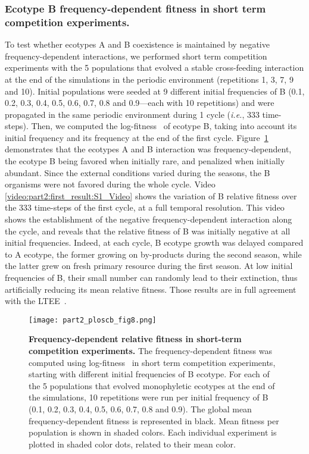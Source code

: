 \subsubsection*{Ecotype B frequency-dependent fitness in short term competition experiments.}

To test whether ecotypes A and B coexistence is maintained by negative frequency-dependent interactions, we performed short term competition experiments with the 5 populations that evolved a stable cross-feeding interaction at the end of the simulations in the periodic environment (repetitions 1, 3, 7, 9 and 10). Initial populations were seeded at 9 different initial frequencies of B (0.1, 0.2, 0.3, 0.4, 0.5, 0.6, 0.7, 0.8 and 0.9---each with 10 repetitions) and were propagated in the same periodic environment during 1 cycle (\textit{i.e.}, 333 time-steps). Then, we computed the log-fitness~\citep{chevin-2011} of ecotype B, taking into account its initial frequency and its frequency at the end of the first cycle. Figure~\ref{fig:part2:first_result:Fig8} demonstrates that the ecotypes A and B interaction was frequency-dependent, the ecotype B being favored when initially rare, and penalized when initially abundant.
Since the external conditions varied during the seasons, the B organisms were not favored during the whole cycle. Video \ref{video:part2:first_result:S1_Video} shows the variation of B relative fitness over the 333 time-steps of the first cycle, at a full temporal resolution. This video shows the establishment of the negative frequency-dependent interaction along the cycle, and reveals that the relative fitness of B was initially negative at all initial frequencies. Indeed, at each cycle, B ecotype growth was delayed compared to A ecotype, the former growing on by-products during the second season, while the latter grew on fresh primary resource during the first season.
At low initial frequencies of B, their small number can randomly lead to their extinction, thus artificially reducing its mean relative fitness.
Those results are in full agreement with the LTEE~\citep{rozen-et-al-2000,ribeck-lenski-2015}.

\begin{figure}[!h]
\centering
\texttt{[image: part2\_ploscb\_fig8.png]}
\caption[Frequency-dependent relative fitness in short-term competition experiments.]{{\bf Frequency-dependent relative fitness in short-term competition experiments.} The frequency-dependent fitness was computed using log-fitness~\cite{chevin-2011,ribeck-lenski-2015} in short term competition experiments, starting with different initial frequencies of B ecotype. For each of the 5 populations that evolved monophyletic ecotypes at the end of the simulations, 10 repetitions were run per initial frequency of B (0.1, 0.2, 0.3, 0.4, 0.5, 0.6, 0.7, 0.8 and 0.9). The global mean frequency-dependent fitness is represented in black. Mean fitness per population is shown in shaded colors. Each individual experiment is plotted in shaded color dots, related to their mean color.}
\label{fig:part2:first_result:Fig8}
\end{figure}

